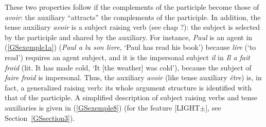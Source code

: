 \documentclass[output=paper
                ,modfonts
                ,nonflat
	        ,collection
	        ,collectionchapter
	        ,collectiontoclongg
 	        ,biblatex
                ,babelshorthands
                ,newtxmath
                ,draftmode
                ,colorlinks, citecolor=brown
]{./langsci/langscibook}
\begin{document}
{\eal 
	\label{GSexemple7}
	\label{GSexemple7a}
		
	\label{GSexemple7b}
		
	\label{GSexemple7c}
\zl

These two properties follow if the complements of the participle become those of \emph{avoir}: the auxiliary ``attracts'' the complements of the participle. In addition, the tense auxiliary \emph{avoir} is a subject raising verb (see chap ?): the subject is selected by the participle and shared by the auxiliary. For instance, \emph{Paul} is an agent in (\ref{GSexemple1a}) (\emph{Paul a lu son livre}, `Paul has read his book') because \emph{lire} (`to read') requires an agent subject, and it is the impersonal subject \emph{il} in \emph{Il a fait froid} (lit. It has made cold, `It [the weather] was cold'), because the subject of \emph{faire froid} is impersonal. Thus, the auxiliary \emph{avoir} (like tense auxiliary \emph{\^etre}) is, in fact, a generalized raising verb: its whole argument structure is identified with that of the participle. A simplified description of subject raising verbs and tense auxiliaries is given in (\ref{GSexemple8}) (for the feature [LIGHT$\pm$], see Section~\ref{GSsection3}).

\begin{exe}
	\ex 	\label{GSexemple8}
	\begin{xlist}
	

\end{xlist}
\end{exe}}
\end{document}
